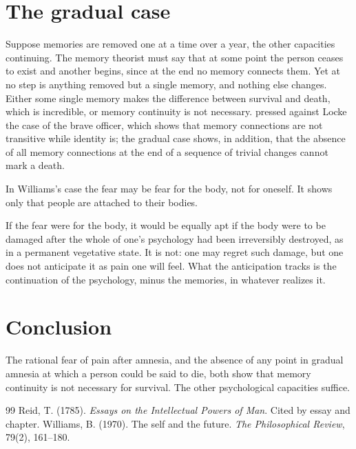 \documentclass{situationist-preprint}
\begin{document}
\section{The gradual case}

Suppose memories are removed one at a time over a year, the other capacities continuing. The memory theorist must say that at some point the person ceases to exist and another begins, since at the end no memory connects them. Yet at no step is anything removed but a single memory, and nothing else changes. Either some single memory makes the difference between survival and death, which is incredible, or memory continuity is not necessary. \citet[III.6]{Reid1785} pressed against Locke the case of the brave officer, which shows that memory connections are not transitive while identity is; the gradual case shows, in addition, that the absence of all memory connections at the end of a sequence of trivial changes cannot mark a death.

\begin{objection}
In Williams's case the fear may be fear for the body, not for oneself. It shows only that people are attached to their bodies.
\end{objection}

\begin{reply}
If the fear were for the body, it would be equally apt if the body were to be damaged after the whole of one's psychology had been irreversibly destroyed, as in a permanent vegetative state. It is not: one may regret such damage, but one does not anticipate it as pain one will feel. What the anticipation tracks is the continuation of the psychology, minus the memories, in whatever realizes it.
\end{reply}

\section{Conclusion}

The rational fear of pain after amnesia, and the absence of any point in gradual amnesia at which a person could be said to die, both show that memory continuity is not necessary for survival. The other psychological capacities suffice.

\begin{thebibliography}{99}\small
{} Reid, T. (1785). \emph{Essays on the Intellectual Powers of Man}. Cited by essay and chapter.
 Williams, B. (1970). The self and the future. \emph{The Philosophical Review}, 79(2), 161--180.
\end{thebibliography}
\end{document}
